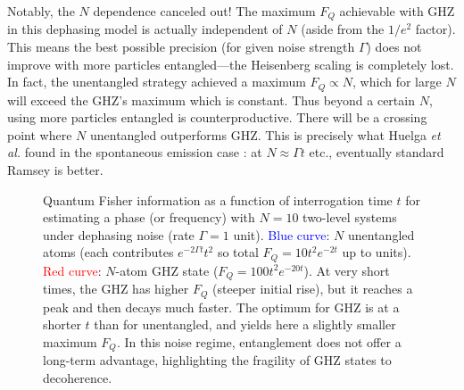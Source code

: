 Notably, the $N$ dependence canceled out! The maximum $F_Q$ achievable
with GHZ in this dephasing model is actually independent of $N$ (aside
from the $1/e^2$ factor). This means the best possible precision (for
given noise strength $\Gamma$) does not improve with more particles
entangled—the Heisenberg scaling is completely lost. In fact, the
unentangled strategy achieved a maximum $F_Q \propto N$, which for
large $N$ will exceed the GHZ’s maximum which is constant. Thus beyond
a certain $N$, using more particles entangled is
counterproductive. There will be a crossing point where $N$
unentangled outperforms GHZ. This is precisely what Huelga \textit{et
  al.} found in the spontaneous emission case \cite{Huelga1997}: at $N
\approx \Gamma t$ etc., eventually standard Ramsey is better.



\begin{figure}[tb]

\centering


\caption{Quantum Fisher information as a function of interrogation time $t$ for estimating a phase (or frequency) with $N=10$ two-level systems under dephasing noise (rate $\Gamma=1$ unit). \textcolor{blue}{Blue curve}: $N$ unentangled atoms (each contributes $e^{-2\Gamma t}t^2$ so total $F_Q = 10 t^2 e^{-2t}$ up to units). \textcolor{red}{Red curve}: $N$-atom GHZ state ($F_Q = 100 t^2 e^{-20 t}$). At very short times, the GHZ has higher $F_Q$ (steeper initial rise), but it reaches a peak and then decays much faster. The optimum for GHZ is at a shorter $t$ than for unentangled, and yields here a slightly smaller maximum $F_Q$. In this noise regime, entanglement does not offer a long-term advantage, highlighting the fragility of GHZ states to decoherence.}

\label{fig:GHZ-dephasing}

\end{figure}



